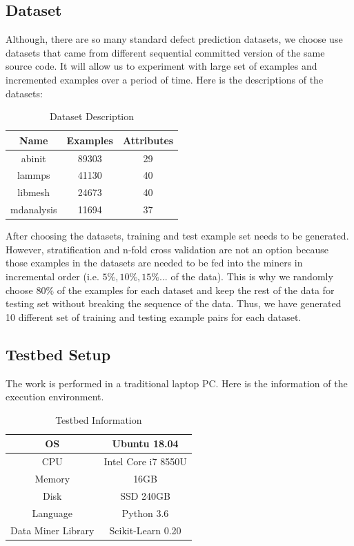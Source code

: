 \documentclass[sigplan]{acmart}\settopmatter{printfolios=true,printccs=false,printacmref=false}
\begin{document}
\subsection{Dataset}
Although, there are so many standard defect prediction datasets, we choose use datasets that came from different sequential committed version of the same source code. It will allow us to experiment with large set of examples and incremented examples over a period of time. Here is the descriptions of the datasets:

\begin{center}
	\begin{table}[h]
			\begin{tabular}{|c|c|c|}
			\hline 
			\textbf{Name} & \textbf{Examples} & \textbf{Attributes} \\ 
			\hline 
			abinit & 89303 & 29 \\ 
			\hline 
			lammps & 41130 & 40 \\ 
			\hline 
			libmesh & 24673 & 40 \\ 
			\hline 
			mdanalysis & 11694 & 37 \\ 
			\hline
		\end{tabular}   
	\caption{Dataset Description}
	\label{tab:dataset}
	\end{table}
\end{center}

After choosing the datasets, training and test example set needs to be generated. However, stratification and n-fold cross validation are not an option because those examples in the datasets are needed to be fed into the miners in incremental order (i.e. $5\%, 10\%, 15\%... $ of the data). This is why we randomly choose $80\%$ of the examples for each dataset and keep the rest of the data for testing set without breaking the sequence of the data. Thus, we have generated 10 different set of training and testing example pairs for each dataset. 

\subsection{Testbed Setup}
The work is performed in a traditional laptop PC. Here is the information of the execution environment.

\begin{center}
	\begin{table}[h]
		\begin{tabular}{|c|c|}
			\hline 
			OS & Ubuntu 18.04 \\ 
			\hline 
			CPU & Intel Core i7 8550U \\ 
			\hline 
			Memory & 16GB \\ 
			\hline 
			Disk & SSD 240GB \\ 
			\hline 
			Language & Python 3.6 \\ 
			\hline 
			Data Miner Library & Scikit-Learn 0.20 \\ 
			\hline  
		\end{tabular} 
	\caption{Testbed Information}
	\label{tab:testbed}
	\end{table}
\end{center}
\end{document}

